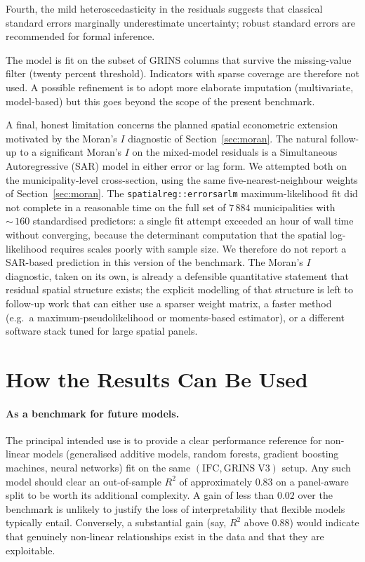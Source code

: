 \documentclass[11pt,a4paper]{article}
\begin{document}
Fourth, the mild heteroscedasticity in the residuals suggests that
classical standard errors marginally underestimate uncertainty;
robust standard errors are recommended for formal inference.

The model is fit on the subset of GRINS columns that survive the
missing-value filter (twenty percent threshold). Indicators with
sparse coverage are therefore not used. A possible refinement is to
adopt more elaborate imputation (multivariate, model-based) but this
goes beyond the scope of the present benchmark.

A final, honest limitation concerns the planned spatial econometric
extension motivated by the Moran's \(I\) diagnostic of
Section~\ref{sec:moran}. The natural follow-up to a significant
Moran's \(I\) on the mixed-model residuals is a Simultaneous
Autoregressive (SAR) model in either error or lag form. We attempted
both on the municipality-level cross-section, using the same
five-nearest-neighbour weights of Section~\ref{sec:moran}. The
\texttt{spatialreg::errorsarlm} maximum-likelihood fit did not
complete in a reasonable time on the full set of \(7\,884\)
municipalities with \(\sim\,160\) standardised predictors: a single
fit attempt exceeded an hour of wall time without converging,
because the determinant computation that the spatial
log-likelihood requires scales poorly with sample size. We therefore
do not report a SAR-based prediction in this version of the
benchmark. The Moran's \(I\) diagnostic, taken on its own, is
already a defensible quantitative statement that residual spatial
structure exists; the explicit modelling of that structure is left
to follow-up work that can either use a sparser weight matrix, a
faster method (e.g.\ a maximum-pseudolikelihood or moments-based
estimator), or a different software stack tuned for large spatial
panels.

\section{How the Results Can Be Used}
\label{sec:use}

\paragraph{As a benchmark for future models.}
The principal intended use is to provide a clear performance reference
for non-linear models (generalised additive models, random forests,
gradient boosting machines, neural networks) fit on the same
\((\mathrm{IFC}, \mathrm{GRINS\;V3})\) setup. Any such model should
clear an out-of-sample \(R^{2}\) of approximately \(0.83\) on a
panel-aware split to be worth its additional complexity. A gain of
less than \(0.02\) over the benchmark is unlikely to justify the loss
of interpretability that flexible models typically entail. Conversely,
a substantial gain (say, \(R^{2}\) above \(0.88\)) would indicate that
genuinely non-linear relationships exist in the data and that they
are exploitable.
\end{document}
